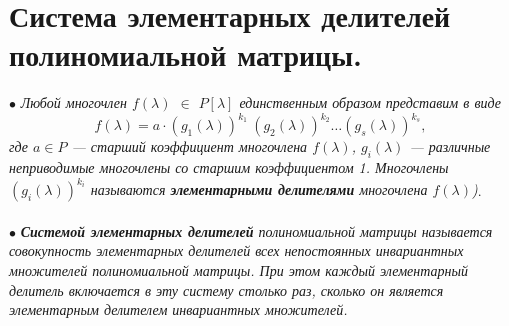 \section{Система элементарных делителей полиномиальной матрицы.}
$\bullet$ \textit{Любой многочлен $f(\lambda)$ $\in$ $P[\lambda]$ единственным образом представим в виде}
$$f(\lambda) = a \cdot (g_1(\lambda))^{k_1} \ (g_2(\lambda))^{k_2} \ldots (g_s(\lambda))^{k_s},$$ \textit{где $a\in P$ --- старший коэффициент многочлена $f(\lambda)$, $g_i(\lambda)$ --- различные неприводимые многочлены со старшим коэффициентом 1. Многочлены $(g_i(\lambda))^{k_i}$ называются \textbf{элементарными делителями} многочлена $f(\lambda)$)}.\\\\
$\bullet$ \textit{\textbf{ Системой элементарных делителей} полиномиальной матрицы называется
	совокупность элементарных делителей всех непостоянных инвариантных
	множителей полиномиальной матрицы. При этом каждый элементарный
	делитель включается в эту систему столько раз, сколько он является
	элементарным делителем инвариантных множителей.}
